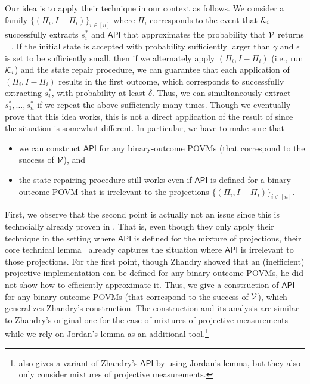 Our idea is to apply their technique in our context as follows. We consider a family $\{(\Pi_i,I-\Pi_i)\}_{i\in[n]}$ where $\Pi_i$ corresponds to the event that $\mathcal{K}_i$ successfully extracts $s_i^*$ and $\mathsf{API}$ that approximates the probability that $\mathcal{V}$ returns $\top$. 
If the initial state is accepted with probability sufficiently larger than $\gamma$ and $\epsilon$ is set to be sufficiently small,  
then if we alternately apply $(\Pi_i,I-\Pi_i)$ (i.e., run $\mathcal{K}_i$)  and the state repair procedure, we can guarantee that each application of  $(\Pi_i,I-\Pi_i)$ results in the first outcome, which corresponds to successfully extracting $s_i^*$, with probability at least $\delta$. 
Thus, we can simultaneously extract $s_1^*, \ldots,s_n^*$ if we repeat the above sufficiently many times.  
Though we eventually prove that this idea works, this is not a direct application of the result of \cite{FOCS:CMSZ21} since the situation is somewhat different. 
In particular, we have to make sure that 
\begin{itemize}
\item we can construct $\mathsf{API}$ for any binary-outcome POVMs (that correspond to the success of $\mathcal{V}$), and 
\item the state repairing procedure still works even if $\mathsf{API}$ is defined for a binary-outcome POVM that is irrelevant to the projections $\{(\Pi_i,I-\Pi_i)\}_{i\in[n]}$. 
\end{itemize}
First, we observe that the second point is actually not an issue since this is techncially already proven in \cite{FOCS:CMSZ21}. 
That is, even though they only apply their technique in the setting where $\mathsf{API}$ is defined for the mixture of projections, their core technical lemma~\cite[Lemma 4.10]{FOCS:CMSZ21} already captures the situation where $\mathsf{API}$ is irrelevant to those projections. 
For the first point, though Zhandry showed that an (inefficient) projective implementation can be defined for any binary-outcome POVMs, he did not show how to efficiently approximate it.  
Thus, we give a construction of $\mathsf{API}$ for any binary-outcome POVMs (that correspond to the success of $\mathcal{V}$), which generalizes Zhandry's construction. 
The construction and its analysis are similar to Zhandry's original one for the case of mixtures of projective measurements 
while we rely on Jordan's lemma as an additional tool.\footnote{\cite{FOCS:CMSZ21} also gives a variant of Zhandry's $\mathsf{API}$ by using Jordan's lemma, but they also only consider mixtures of projective measurements.}  



